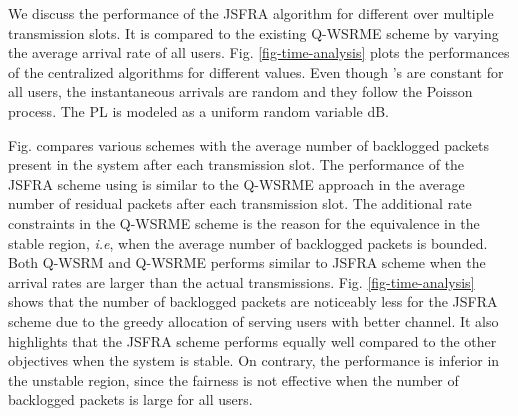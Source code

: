 
We discuss the performance of the \ac{JSFRA} algorithm for different  over multiple transmission slots. It is compared to the existing \ac{Q-WSRME} scheme by varying the average arrival rate  of all users. Fig. \ref{fig-time-analysis} plots the performances of the centralized algorithms for different  values. Even though 's are constant for all users, the instantaneous arrivals are random and they follow the Poisson process. The \ac{PL} is modeled as a uniform random variable \me{[0,-6]} dB.

Fig.  compares various schemes with the average number of backlogged packets present in the system after each transmission slot. The performance of the \ac{JSFRA} scheme using  is similar to the \ac{Q-WSRME} approach in the average number of residual packets after each transmission slot. The additional rate constraints in the \ac{Q-WSRME} scheme is the reason for the equivalence in the stable region, \textit{i.e}, when the average number of backlogged packets is bounded. Both \ac{Q-WSRM} and \ac{Q-WSRME} performs similar to  \ac{JSFRA} scheme when the arrival rates are larger than the actual transmissions. Fig. \ref{fig-time-analysis} shows that the number of backlogged packets are noticeably less for the  \ac{JSFRA} scheme due to the greedy allocation of serving users with better channel. It also highlights that the \me{\ell_{\infty}} \ac{JSFRA} scheme performs equally well compared to the other objectives when the system is stable. On contrary, the performance is inferior in the unstable region, since the fairness is not effective when the number of backlogged packets is large for all users. 


